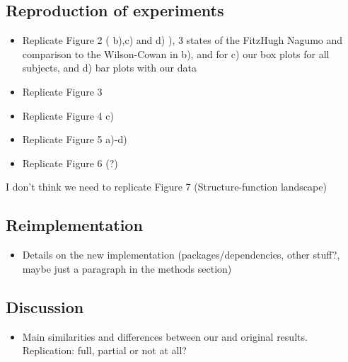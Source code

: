 \subsection{Reproduction of experiments}

\begin{itemize}
 \item 
  Replicate Figure 2 ( b),c) and d) ), 3 states of the FitzHugh Nagumo and comparison to the Wilson-Cowan in b),
  and for c) our box plots for all subjects, and d) bar plots with our data
  
 \item
  Replicate Figure 3 

 \item
  Replicate Figure 4 c) 
  
 \item
  Replicate Figure 5 a)-d)
  
 \item
  Replicate Figure 6 (?)
\end{itemize}

I don't think we need to replicate Figure 7 (Structure-function landscape)

\subsection{Reimplementation}

\begin{itemize}
 \item 
  Details on the new implementation (packages/dependencies, other stuff?, maybe just a paragraph in the methods section) 
\end{itemize}

 




\subsection{Discussion}

\begin{itemize}
 \item 
  Main similarities and differences between our and original results. Replication: full, partial or not at all?
\end{itemize}

